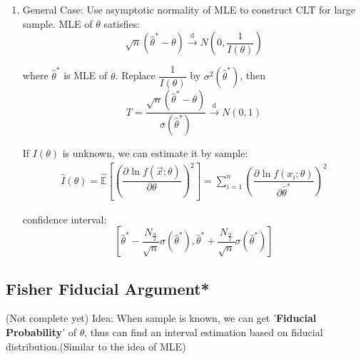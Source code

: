 \begin{enumerate}

    
    \item General Case: Use asymptotic normality of MLE to construct CLT for large sample. MLE of $\theta$ satisfies:
    \begin{equation}
        \sqrt{n}(\hat{\theta}^*-\theta)\xrightarrow[]{\mathrm{d}}N(0,\frac{1}{I(\theta )})
    \end{equation}

    where $\hat{\theta}^*$ is MLE of $\theta$. Replace $\dfrac{1}{I(\theta)}$ by $\sigma^2(\hat{\theta}^*)$, then
    \begin{equation}
        T=\frac{\sqrt{n}(\hat{\theta}^*-\theta)}{\sigma(\hat{\theta}^*)}\xrightarrow[]{\mathrm{d}}N(0,1)    
    \end{equation}

    If $ I(\theta ) $ is unknown, we can estimate it by sample:
    \begin{align}
        \hat{I}(\theta )=\hat{\mathbb{E}}\left[\left(\dfrac{\partial^{} \ln f(\vec{x};\theta )}{\partial \theta ^{}}\right)^2\right]=\sum_{i=1}^n \left(\dfrac{\partial^{} \ln f(x_i;\theta )}{\partial \hat{\theta}^*}\right)^2
    \end{align}

    confidence interval:
    \begin{equation}
        \left[\hat{\theta}^*-\frac{N_{\frac{\alpha}{2}}}{\sqrt{n}}\sigma(\hat{\theta}^*),\hat{\theta}^*+\frac{N_{\frac{\alpha}{2}}}{\sqrt{n}}\sigma(\hat{\theta}^*)\right]
    \end{equation}
    \end{enumerate}


\subsection{Fisher Fiducial Argument*}\label{SubSectionFisherFiducialArgument}
    (Not complete yet)
    Idea: When sample is known, we can get '\textbf{Fiducial Probability}' of $\theta$, thus can find an interval estimation based on fiducial distribution.(Similar to the idea of MLE)

